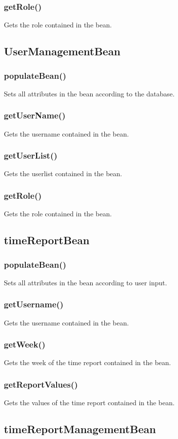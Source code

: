 \documentclass{article}
\begin{document}
\subsubsection{getRole()}
Gets the role contained in the bean.

\subsection{UserManagementBean}
\subsubsection{populateBean()}
Sets all attributes in the bean according to the database.
\subsubsection{getUserName()}
Gets the username contained in the bean.
\subsubsection{getUserList()}
Gets the userlist contained in the bean.
\subsubsection{getRole()}
Gets the role contained in the bean.
\subsection{timeReportBean}
\subsubsection{populateBean()}
Sets all attributes in the bean according to user input.
\subsubsection{getUsername()}
Gets the username contained in the bean.
\subsubsection{getWeek()}
Gets the week of the time report contained in the bean.
\subsubsection{getReportValues()}
Gets the values of the time report contained in the bean.

\subsection{timeReportManagementBean}
\end{document}
